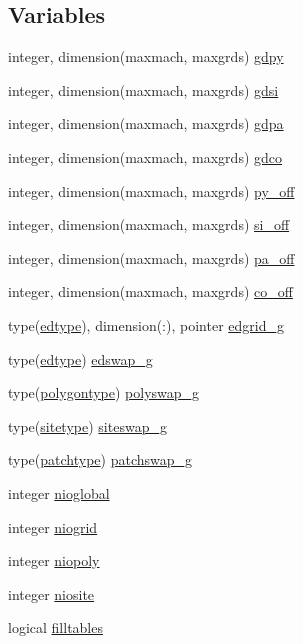 \subsection*{Variables}
\begin{DoxyCompactItemize}
\item 
integer, dimension(maxmach, maxgrds) \hyperlink{namespaceed__state__vars_aac712f975ee36c66ad91c4b4687cdf71}{gdpy}
\item 
integer, dimension(maxmach, maxgrds) \hyperlink{namespaceed__state__vars_a77208cdb17b6a08bcdd07c476d5c6139}{gdsi}
\item 
integer, dimension(maxmach, maxgrds) \hyperlink{namespaceed__state__vars_ad2a53bb636997523d8bdacfaa6f1b9b9}{gdpa}
\item 
integer, dimension(maxmach, maxgrds) \hyperlink{namespaceed__state__vars_a4fc7c00baa15ee35e1703f12faa7fae2}{gdco}
\item 
integer, dimension(maxmach, maxgrds) \hyperlink{namespaceed__state__vars_a7ebd94319455148e1487107c339113ca}{py\+\_\+off}
\item 
integer, dimension(maxmach, maxgrds) \hyperlink{namespaceed__state__vars_a40e5ef082020264b3ac022cbf41351e1}{si\+\_\+off}
\item 
integer, dimension(maxmach, maxgrds) \hyperlink{namespaceed__state__vars_a5d1fee7506efe5c3d326478d44f97e42}{pa\+\_\+off}
\item 
integer, dimension(maxmach, maxgrds) \hyperlink{namespaceed__state__vars_abb0498b9e5f1a7195d6260a97973b89f}{co\+\_\+off}
\item 
type(\hyperlink{structed__state__vars_1_1edtype}{edtype}), dimension(\+:), pointer \hyperlink{namespaceed__state__vars_a1ad47f9c446f02cad8b7a7a2bce06c8a}{edgrid\+\_\+g}
\item 
type(\hyperlink{structed__state__vars_1_1edtype}{edtype}) \hyperlink{namespaceed__state__vars_a42ec67e3b97c2e4abb244b7ec1e7f4c2}{edswap\+\_\+g}
\item 
type(\hyperlink{structed__state__vars_1_1polygontype}{polygontype}) \hyperlink{namespaceed__state__vars_ae193a761d3f04f8bb0bf11c6e624f7b7}{polyswap\+\_\+g}
\item 
type(\hyperlink{structed__state__vars_1_1sitetype}{sitetype}) \hyperlink{namespaceed__state__vars_ae55643d7022454835dc2a4b11c4a2b04}{siteswap\+\_\+g}
\item 
type(\hyperlink{structed__state__vars_1_1patchtype}{patchtype}) \hyperlink{namespaceed__state__vars_ad11390031b4401ce635598920fc0523a}{patchswap\+\_\+g}
\item 
integer \hyperlink{namespaceed__state__vars_ad27fcaec6a546cf46df5c40ddbf1bde1}{nioglobal}
\item 
integer \hyperlink{namespaceed__state__vars_ad3c5095a2e6e68fda8c698372a614a6e}{niogrid}
\item 
integer \hyperlink{namespaceed__state__vars_acc17e1323f7365a8a43c74ceb839eb10}{niopoly}
\item 
integer \hyperlink{namespaceed__state__vars_ad692c1e699708ecf209c08544c730efd}{niosite}
\item 
logical \hyperlink{namespaceed__state__vars_a5f3e4a557e76387c621a3dddd988ff01}{filltables}
\end{DoxyCompactItemize}


